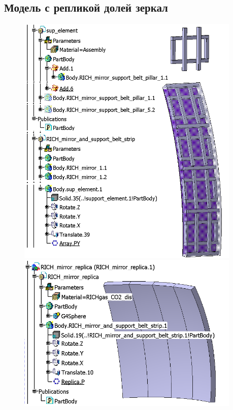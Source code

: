 \subsection{Модель с репликой долей зеркал}

\begin{figure}[H]
\begin{minipage}[t]{0.495\textwidth}
\includegraphics[width=0.95\textwidth]{pictures/CbmRichMirror1.png}
\end{minipage}
\hspace{0.01\textwidth}
\begin{minipage}[t]{0.495\textwidth}
\includegraphics[width=0.95\textwidth]{pictures/CbmRichMirror2.png}
\end{minipage}
\caption{}
\label{fig:ReplicaMirror}
\end{figure}



